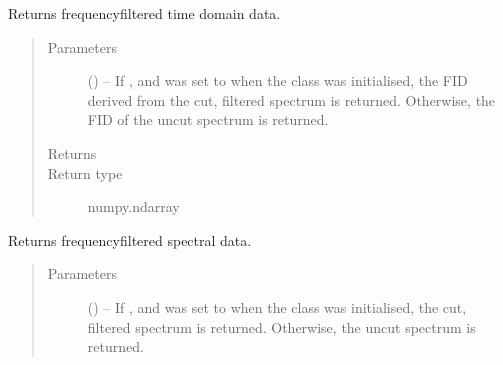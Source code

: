 \documentclass[letterpaper,10pt,english]{sphinxmanual}
\begin{document}
\begin{fulllineitems}
\begin{fulllineitems}
\label{\detokenize{references/freqfilter:nmrespy.freqfilter.FrequencyFilter.get_fid}}
\sphinxAtStartPar
Returns frequency\sphinxhyphen{}filtered time domain data.
\begin{quote}\begin{description}
\item[{Parameters}] \leavevmode
\sphinxAtStartPar
{} (\sphinxstyleliteralemphasis{\sphinxupquote{, }}) – If , and  was set to  when the class was
initialised, the FID derived from the cut, filtered spectrum is
returned. Otherwise, the FID of the uncut spectrum is returned.

\item[{Returns}] \leavevmode
\sphinxAtStartPar
{}

\item[{Return type}] \leavevmode
\sphinxAtStartPar
numpy.ndarray

\end{description}\end{quote}

\end{fulllineitems}


\begin{fulllineitems}
\label{\detokenize{references/freqfilter:nmrespy.freqfilter.FrequencyFilter.get_filtered_spectrum}}
\sphinxAtStartPar
Returns frequency\sphinxhyphen{}filtered spectral data.
\begin{quote}\begin{description}
\item[{Parameters}] \leavevmode
\sphinxAtStartPar
{} (\sphinxstyleliteralemphasis{\sphinxupquote{, }}) – If , and  was set to  when the class was
initialised, the cut, filtered spectrum is returned. Otherwise,
the uncut spectrum is returned.


\end{description}
\end{quote}
\end{fulllineitems}
\end{fulllineitems}
\end{document}
